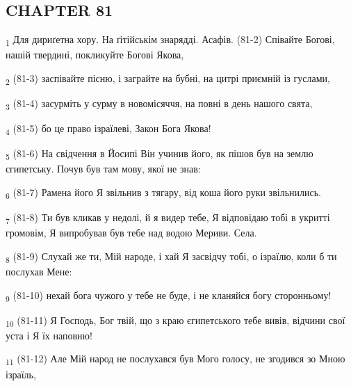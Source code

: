 \subsection{CHAPTER 81}
\begin{tcolorbox}
\textsubscript{1} Для дириґетна хору. На ґітійськім знарядді. Асафів. (81-2) Співайте Богові, нашій твердині, покликуйте Богові Якова,
\end{tcolorbox}
\begin{tcolorbox}
\textsubscript{2} (81-3) заспівайте пісню, і заграйте на бубні, на цитрі приємній із гуслами,
\end{tcolorbox}
\begin{tcolorbox}
\textsubscript{3} (81-4) засурміть у сурму в новомісяччя, на повні в день нашого свята,
\end{tcolorbox}
\begin{tcolorbox}
\textsubscript{4} (81-5) бо це право ізраїлеві, Закон Бога Якова!
\end{tcolorbox}
\begin{tcolorbox}
\textsubscript{5} (81-6) На свідчення в Йосипі Він учинив його, як пішов був на землю єгипетську. Почув був там мову, якої не знав:
\end{tcolorbox}
\begin{tcolorbox}
\textsubscript{6} (81-7) Рамена його Я звільнив з тягару, від коша його руки звільнились.
\end{tcolorbox}
\begin{tcolorbox}
\textsubscript{7} (81-8) Ти був кликав у недолі, й я видер тебе, Я відповідаю тобі в укритті громовім, Я випробував був тебе над водою Мериви. Села.
\end{tcolorbox}
\begin{tcolorbox}
\textsubscript{8} (81-9) Слухай же ти, Мій народе, і хай Я засвідчу тобі, о ізраїлю, коли б ти послухав Мене:
\end{tcolorbox}
\begin{tcolorbox}
\textsubscript{9} (81-10) нехай бога чужого у тебе не буде, і не кланяйся богу сторонньому!
\end{tcolorbox}
\begin{tcolorbox}
\textsubscript{10} (81-11) Я Господь, Бог твій, що з краю єгипетського тебе вивів, відчини свої уста і Я їх наповню!
\end{tcolorbox}
\begin{tcolorbox}
\textsubscript{11} (81-12) Але Мій народ не послухався був Мого голосу, не згодився зо Мною ізраїль,
\end{tcolorbox}
